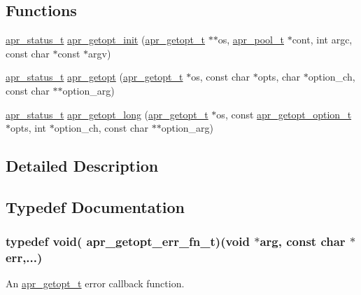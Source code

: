 \subsection*{Functions}
\begin{DoxyCompactItemize}
\item 
\hyperlink{group__apr__errno_gaf76ee4543247e9fb3f3546203e590a6c}{apr\-\_\-status\-\_\-t} \hyperlink{group__apr__getopt_gaaab2b4bfb62361af7a2d427f5f29a3d4}{apr\-\_\-getopt\-\_\-init} (\hyperlink{structapr__getopt__t}{apr\-\_\-getopt\-\_\-t} $\ast$$\ast$os, \hyperlink{group__apr__pools_gaf137f28edcf9a086cd6bc36c20d7cdfb}{apr\-\_\-pool\-\_\-t} $\ast$cont, int argc, const char $\ast$const $\ast$argv)
\item 
\hyperlink{group__apr__errno_gaf76ee4543247e9fb3f3546203e590a6c}{apr\-\_\-status\-\_\-t} \hyperlink{group__apr__getopt_ga289cdcf7eacc997eb91fea7c02d08934}{apr\-\_\-getopt} (\hyperlink{structapr__getopt__t}{apr\-\_\-getopt\-\_\-t} $\ast$os, const char $\ast$opts, char $\ast$option\-\_\-ch, const char $\ast$$\ast$option\-\_\-arg)
\item 
\hyperlink{group__apr__errno_gaf76ee4543247e9fb3f3546203e590a6c}{apr\-\_\-status\-\_\-t} \hyperlink{group__apr__getopt_ga80d6ff2213da4e25406b3f179fa13989}{apr\-\_\-getopt\-\_\-long} (\hyperlink{structapr__getopt__t}{apr\-\_\-getopt\-\_\-t} $\ast$os, const \hyperlink{structapr__getopt__option__t}{apr\-\_\-getopt\-\_\-option\-\_\-t} $\ast$opts, int $\ast$option\-\_\-ch, const char $\ast$$\ast$option\-\_\-arg)
\end{DoxyCompactItemize}


\subsection{Detailed Description}


\subsection{Typedef Documentation}
\hypertarget{group__apr__getopt_gae82318936f08cc3531ce9b0856422f27}{
\subsubsection[{apr\-\_\-getopt\-\_\-err\-\_\-fn\-\_\-t}]{\setlength{\rightskip}{0pt plus 5cm}typedef void( apr\-\_\-getopt\-\_\-err\-\_\-fn\-\_\-t)(void $\ast$arg, const char $\ast$err,...)}}\label{group__apr__getopt_gae82318936f08cc3531ce9b0856422f27}
An {\ttfamily \hyperlink{structapr__getopt__t}{apr\-\_\-getopt\-\_\-t}} error callback function.

